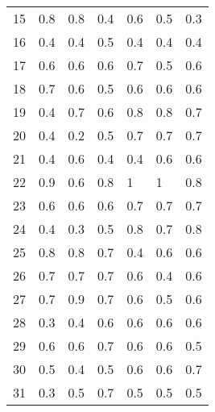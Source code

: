 \begin{table}[]
\begin{tabular}{l|lll|lll}
15              & 0.8                  & 0.8       & 0.4     & 0.6     & 0.5 & 0.3     \\
16              & 0.4                  & 0.4       & 0.5     & 0.4     & 0.4 & 0.4     \\
17              & 0.6                  & 0.6       & 0.6     & 0.7     & 0.5 & 0.6     \\
18              & 0.7                  & 0.6       & 0.5     & 0.6     & 0.6 & 0.6     \\
19              & 0.4                  & 0.7       & 0.6     & 0.8     & 0.8 & 0.7     \\
20              & 0.4                  & 0.2       & 0.5     & 0.7     & 0.7 & 0.7     \\
21              & 0.4                  & 0.6       & 0.4     & 0.4     & 0.6 & 0.6     \\
22              & 0.9                  & 0.6       & 0.8     & 1       & 1   & 0.8     \\
23              & 0.6                  & 0.6       & 0.6     & 0.7     & 0.7 & 0.7     \\
24              & 0.4                  & 0.3       & 0.5     & 0.8     & 0.7 & 0.8     \\
25              & 0.8                  & 0.8       & 0.7     & 0.4     & 0.6 & 0.6     \\
26              & 0.7                  & 0.7       & 0.7     & 0.6     & 0.4 & 0.6     \\
27              & 0.7                  & 0.9       & 0.7     & 0.6     & 0.5 & 0.6     \\
28              & 0.3                  & 0.4       & 0.6     & 0.6     & 0.6 & 0.6     \\
29              & 0.6                  & 0.6       & 0.7     & 0.6     & 0.6 & 0.5     \\
30              & 0.5                  & 0.4       & 0.5     & 0.6     & 0.6 & 0.7     \\
31              & 0.3                  & 0.5       & 0.7     & 0.5     & 0.5 & 0.5     \\
\end{tabular}
\end{table}
\clearpage
